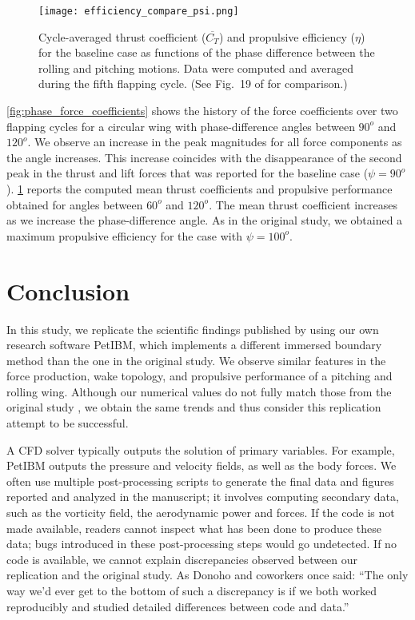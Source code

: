 \begin{figure}[!h]
  \centering
  \texttt{[image: efficiency\_compare\_psi.png]}
  \caption{Cycle-averaged thrust coefficient ($\overline{C_T}$) and propulsive efficiency ($\eta$) for the baseline case as functions of the phase difference between the rolling and pitching motions. Data were computed and averaged during the fifth flapping cycle. (See Fig.~19 of \citet{li_dong_2016} for comparison.)}
  \label{fig:phase_efficiency}
\end{figure}

\cref{fig:phase_force_coefficients} shows the history of the force coefficients over two flapping cycles for a circular wing with phase-difference angles between $90^o$ and $120^o$.
We observe an increase in the peak magnitudes for all force components as the angle increases.
This increase coincides with the disappearance of the second peak in the thrust and lift forces that was reported for the baseline case ($\psi = 90^o$).
\cref{fig:phase_efficiency} reports the computed mean thrust coefficients and propulsive performance obtained for angles between $60^o$ and $120^o$.
The mean thrust coefficient increases as we increase the phase-difference angle.
As in the original study, we obtained a maximum propulsive efficiency for the case with $\psi = 100^o$.

\section{Conclusion}

In this study, we replicate the scientific findings published by \citet{li_dong_2016} using our own research software PetIBM,\supercite{chuang_et_al_2018}
which implements a different immersed boundary method than the one in the original study. We observe similar features in the force production, wake topology, and propulsive performance of a pitching and rolling wing.
Although our numerical values do not fully match those from the original study \citet{li_dong_2016}, we obtain the same trends and thus consider this replication attempt to be successful.

A CFD solver typically outputs the solution of primary variables.
For example, PetIBM outputs the pressure and velocity fields, as well as the body forces.
We often use multiple post-processing scripts to generate the final data and figures reported and analyzed in the manuscript; it involves computing secondary data, such as the vorticity field, the aerodynamic power and forces.
If the code is not made available, readers cannot inspect what has been done to produce these data; bugs introduced in these post-processing steps would go undetected.
If no code is available, we cannot explain discrepancies observed between our replication and the original study.
As Donoho and coworkers\supercite{donoho_et_al_2008} once said: ``The only way we'd ever get to the bottom of such a discrepancy is if we both worked reproducibly and studied detailed differences between code and data.''

